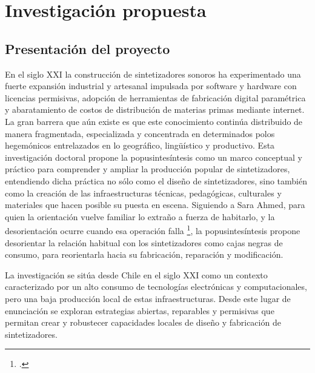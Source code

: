 \documentclass[../candidatura.tex]{subfiles}
\begin{document}
\section{Investigación propuesta}


\subsection{Presentación del proyecto}



En el siglo XXI la construcción de sintetizadores sonoros ha experimentado una fuerte expansión industrial y artesanal impulsada por software y hardware con licencias permisivas, adopción de herramientas de fabricación digital paramétrica y abaratamiento de costos de distribución de materias primas mediante internet. La gran barrera que aún existe es que este conocimiento continúa distribuido de manera fragmentada, especializada y concentrada en determinados polos hegemónicos entrelazados en lo geográfico, lingüístico y productivo. Esta investigación doctoral propone la popusintesíntesis como un marco conceptual y práctico para comprender y ampliar la producción popular de sintetizadores, entendiendo dicha práctica no sólo como el diseño de sintetizadores, sino también como la creación de las infraestructuras técnicas, pedagógicas, culturales y materiales que hacen posible su puesta en escena. Siguiendo a Sara Ahmed, para quien la orientación vuelve familiar lo extraño a fuerza de habitarlo, y la desorientación ocurre cuando esa operación falla \footcite{ahmed_fenomenologia_2024}, la popusintesíntesis propone desorientar la relación habitual con los sintetizadores como cajas negras de consumo, para reorientarla hacia su fabricación, reparación y modificación.

La investigación se sitúa desde Chile en el siglo XXI como un contexto caracterizado por un alto consumo de tecnologías electrónicas y computacionales, pero una baja producción local de estas infraestructuras. Desde este lugar de enunciación se exploran estrategias abiertas, reparables y permisivas que permitan crear y robustecer capacidades locales de diseño y fabricación de sintetizadores.
\end{document}
